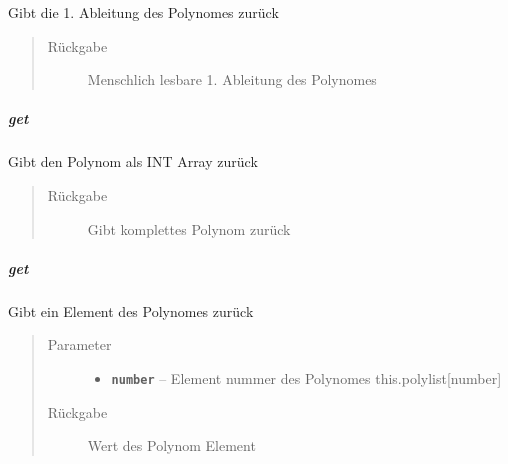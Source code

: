 \documentclass[letterpaper,10pt,ngerman]{sphinxmanual}
\begin{document}
\begin{fulllineitems}
\label{com/linuxluigi/polynomial/Polynomial:com.linuxluigi.polynomial.Polynomial.Derivation()}
Gibt die 1. Ableitung des Polynomes zurück
\begin{quote}\begin{description}
\item[{Rückgabe}] \leavevmode
Menschlich lesbare 1. Ableitung des Polynomes

\end{description}\end{quote}

\end{fulllineitems}



\subparagraph{get}
\label{com/linuxluigi/polynomial/Polynomial:get}

\begin{fulllineitems}
\label{com/linuxluigi/polynomial/Polynomial:com.linuxluigi.polynomial.Polynomial.get()}
Gibt den Polynom als INT Array zurück
\begin{quote}\begin{description}
\item[{Rückgabe}] \leavevmode
Gibt komplettes Polynom zurück

\end{description}\end{quote}

\end{fulllineitems}



\subparagraph{get}
\label{com/linuxluigi/polynomial/Polynomial:id3}

\begin{fulllineitems}
\label{com/linuxluigi/polynomial/Polynomial:com.linuxluigi.polynomial.Polynomial.get(int)}
Gibt ein Element des Polynomes zurück
\begin{quote}\begin{description}
\item[{Parameter}] \leavevmode\begin{itemize}
\item {} 
\textbf{\texttt{number}} -- Element nummer des Polynomes this.polylist{[}number{]}

\end{itemize}

\item[{Rückgabe}] \leavevmode
Wert des Polynom Element

\end{description}\end{quote}

\end{fulllineitems}
\end{document}
